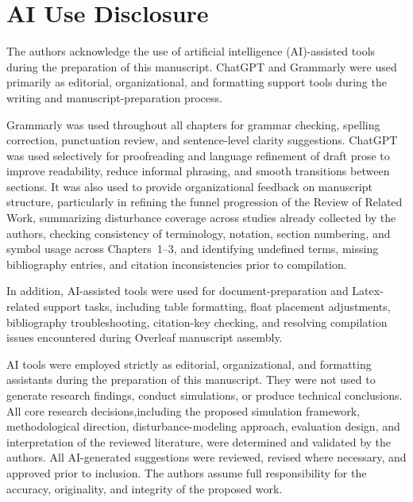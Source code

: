 \documentclass[a4paper, twoside]{report}
\begin{document}
\section*{AI Use Disclosure} \large 


The authors acknowledge the use of artificial intelligence (AI)-assisted tools during the preparation of this manuscript. ChatGPT and Grammarly were used primarily as editorial, organizational, and formatting support tools during the writing and manuscript-preparation process.

Grammarly was used throughout all chapters for grammar checking, spelling correction, punctuation review, and sentence-level clarity suggestions. ChatGPT was used selectively for proofreading and language refinement of draft prose to improve readability, reduce informal phrasing, and smooth transitions between sections. It was also used to provide organizational feedback on manuscript structure, particularly in refining the funnel progression of the Review of Related Work, summarizing disturbance coverage across studies already collected by the authors, checking consistency of terminology, notation, section numbering, and symbol usage across Chapters~1--3, and identifying undefined terms, missing bibliography entries, and citation inconsistencies prior to compilation.

In addition, AI-assisted tools were used for document-preparation and Latex-related support tasks, including table formatting, float placement adjustments, bibliography troubleshooting, citation-key checking, and resolving compilation issues encountered during Overleaf manuscript assembly.

AI tools were employed strictly as editorial, organizational, and formatting assistants during the preparation of this manuscript. They were not used to generate research findings, conduct simulations, or produce technical conclusions. All core research decisions,including the proposed simulation framework, methodological direction, disturbance-modeling approach, evaluation design, and interpretation of the reviewed literature, were determined and validated by the authors. All AI-generated suggestions were reviewed, revised where necessary, and approved prior to inclusion. The authors assume full responsibility for the accuracy, originality, and integrity of the proposed work.





\end{document}
